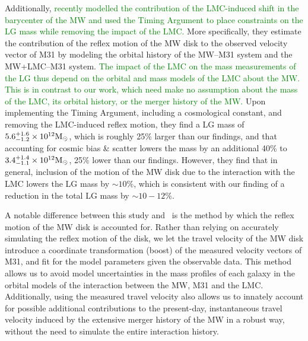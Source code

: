 \documentclass[twocolumn]{aastex631}
\newcommand{\add}[1]{\textcolor{green}{#1}}
\begin{document}
Additionally, \cite{Benisty2022} \add{recently modelled the contribution of the
LMC-induced shift in the barycenter of the MW and used the Timing Argument to
place constraints on the LG mass while removing the impact of the LMC.}
More specifically, they estimate the contribution of the reflex motion of the
MW disk to the observed velocity vector of M31 by modeling the orbital history
of the MW--M31 system and the MW+LMC--M31 system.
\add{The impact of the LMC on the mass measurements of the LG thus depend on the
orbital and mass models of the LMC about the MW. 
This is in contrast to our work, which need make no assumption about the mass of
the LMC, its orbital history, or the merger history of the MW.}
Upon implementing the Timing Argument, including a cosmological constant,
and removing the LMC-induced reflex motion,
they find a LG mass of $5.6^{+1.6}_{-1.2}\times10^{12}\mathrm{M}_\odot$, which is roughly
25\% larger than our findings, and that accounting for cosmic bias \& scatter
lowers the mass by an additional 40\% to $3.4^{+1.4}_{-1.1}\times10^{12}\mathrm{M}_\odot$,
25\% lower than our findings.
However, they find that in general, inclusion of the motion of the MW disk due
to the interaction with the LMC lowers the LG mass by $\sim10\%$, which is
consistent with our finding of a reduction in the total LG mass by $\sim10-12\%$.

A notable difference between this study and~\cite{Benisty2022} is the method by
which the reflex motion of the MW disk is accounted for.
Rather than relying on accurately simulating the reflex motion of the disk, we
let the travel velocity of the MW disk introduce a coordinate transformation
(boost) of the measured velocity vectors of M31, and fit for the model
parameters given the observable data.
This method allows us to avoid model uncertainties in the mass profiles of each
galaxy in the orbital models of the interaction between the MW, M31 and the LMC.
Additionally, using the measured travel velocity also allows us to innately
account for possible additional contributions to the present-day, instantaneous
travel velocity induced by the extensive merger history of the MW in a robust
way, without the need to simulate the entire interaction history.
\end{document}
